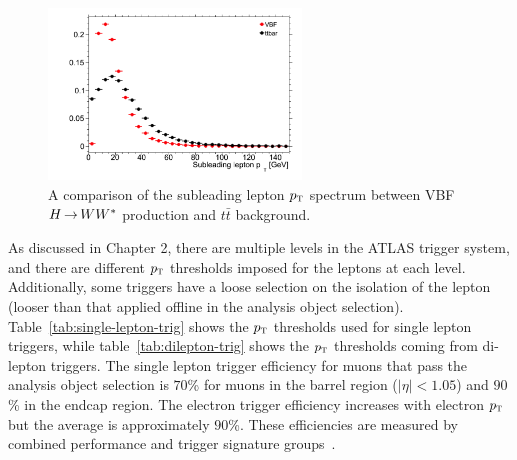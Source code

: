 \begin{figure}[h!]
  \centering
  \captionsetup{justification=centering}

  \includegraphics[width=0.6\textwidth]{figures/lepton_pt}
  \caption{A comparison of the subleading lepton $p_{\textrm{\footnotesize\sc t}}$ spectrum between VBF $H{\,{\rightarrow}\,}WW^\ast$ production and $t\bar{t}$ background.}
  \label{fig:leptonpt}
\end{figure}

As discussed in Chapter 2, there are multiple levels in the ATLAS trigger system, and there are different $p_{\textrm{\footnotesize\sc t}}$ thresholds imposed for the leptons at each level. Additionally, some triggers have a loose selection on the isolation of the lepton (looser than that applied offline in the analysis object selection). Table~\ref{tab:single-lepton-trig} shows the $p_{\textrm{\footnotesize\sc t}}$ thresholds used for single lepton triggers, while table~\ref{tab:dilepton-trig} shows the $p_{\textrm{\footnotesize\sc t}}$ thresholds coming from di-lepton triggers. The single lepton trigger efficiency for muons that pass the analysis object selection is $70$\% for muons in the barrel region ($|\eta| < 1.05$) and $90$\% in the endcap region. The electron trigger efficiency increases with electron $p_{\textrm{\footnotesize\sc t}}$ but the average is approximately $90$\%. These efficiencies are measured by combined performance and trigger signature groups~\cite{MuonTrigger2012,ElectronTrigger2012}.

